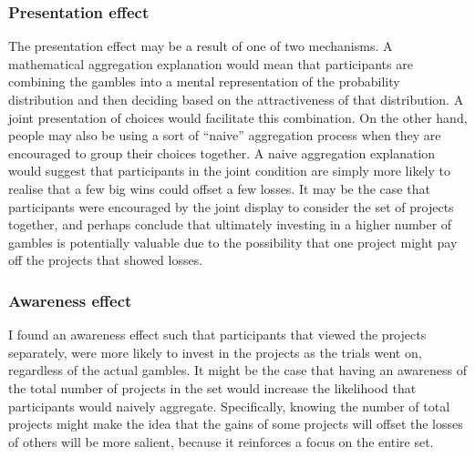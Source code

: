 \documentclass[a4paper, nobind, dvipsnames]{templates/ociamthesis}
\theoremstyle{definition}
\theoremstyle{definition}
\theoremstyle{definition}
\theoremstyle{definition}
\theoremstyle{remark}
\begin{document}
\hypertarget{presentation-effect}{%
\subsubsection{Presentation effect}\label{presentation-effect}}

The presentation effect may be a result of one of two mechanisms. A mathematical
aggregation explanation would mean that participants are combining the gambles
into a mental representation of the probability distribution and then deciding
based on the attractiveness of that distribution. A joint presentation of
choices would facilitate this combination. On the other hand, people may also be
using a sort of ``naive'' aggregation process when they are encouraged to group
their choices together. A naive aggregation explanation would suggest that
participants in the joint condition are simply more likely to realise that a few
big wins could offset a few losses. It may be the case that participants were
encouraged by the joint display to consider the set of projects together, and
perhaps conclude that ultimately investing in a higher number of gambles is
potentially valuable due to the possibility that one project might pay off the
projects that showed losses.

\hypertarget{awareness-effect}{%
\subsubsection{Awareness effect}\label{awareness-effect}}

I found an awareness effect such that participants that viewed the projects
separately, were more likely to invest in the projects as the trials went on,
regardless of the actual gambles. It might be the case that having an awareness
of the total number of projects in the set would increase the likelihood that
participants would naively aggregate. Specifically, knowing the number of total
projects might make the idea that the gains of some projects will offset the
losses of others will be more salient, because it reinforces a focus on the
entire set.
\end{document}
